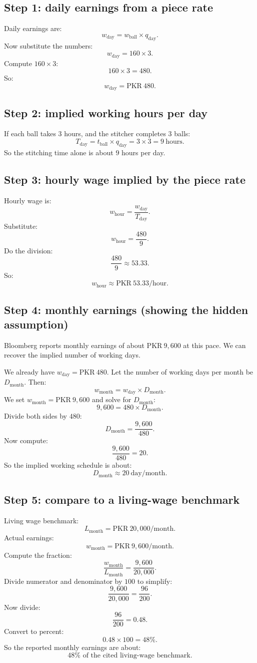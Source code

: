 \documentclass[11pt]{article}
\newcommand{\PKR}{\text{PKR}}
\newcommand{\uBall}{\text{ball}}
\newcommand{\uHour}{\text{hour}}
\newcommand{\uDay}{\text{day}}
\newcommand{\uMonth}{\text{month}}
\begin{document}
\subsection{Step 1: daily earnings from a piece rate}
Daily earnings are:
\[
  w_{\uDay} = w_{\uBall}\times q_{\uDay}.
\]
Now substitute the numbers:
\[
  w_{\uDay} = 160 \times 3.
\]
Compute \(160\times 3\):
\[
  160\times 3 = 480.
\]
So:
\[
  w_{\uDay}=\PKR{}~480.
\]

\subsection{Step 2: implied working hours per day}
If each ball takes \(3\) hours, and the stitcher completes \(3\) balls:
\[
  T_{\uDay} = t_{\uBall}\times q_{\uDay} = 3\times 3 = 9~\text{hours}.
\]
So the stitching time alone is about \(9\) hours per day.

\subsection{Step 3: hourly wage implied by the piece rate}
Hourly wage is:
\[
  w_{\uHour} = \frac{w_{\uDay}}{T_{\uDay}}.
\]
Substitute:
\[
  w_{\uHour}=\frac{480}{9}.
\]
Do the division:
\[
  \frac{480}{9}\approx 53.33.
\]
So:
\[
  w_{\uHour}\approx \PKR{}~53.33/\uHour.
\]

\subsection{Step 4: monthly earnings (showing the hidden assumption)}
Bloomberg reports monthly earnings of about \(\PKR{}~9{,}600\) at this pace.
We can recover the implied number of working days.

We already have \(w_{\uDay}=\PKR{}~480\).
Let the number of working days per month be \(D_{\uMonth}\).
Then:
\[
  w_{\uMonth}=w_{\uDay}\times D_{\uMonth}.
\]
We set \(w_{\uMonth}=\PKR{}~9{,}600\) and solve for \(D_{\uMonth}\):
\[
  9{,}600 = 480\times D_{\uMonth}.
\]
Divide both sides by \(480\):
\[
  D_{\uMonth}=\frac{9{,}600}{480}.
\]
Now compute:
\[
  \frac{9{,}600}{480} = 20.
\]
So the implied working schedule is about:
\[
  D_{\uMonth}\approx 20~\uDay/\uMonth.
\]

\subsection{Step 5: compare to a living-wage benchmark}
Living wage benchmark:
\[
  L_{\uMonth}=\PKR{}~20{,}000/\uMonth.
\]
Actual earnings:
\[
  w_{\uMonth}=\PKR{}~9{,}600/\uMonth.
\]
Compute the fraction:
\[
  \frac{w_{\uMonth}}{L_{\uMonth}}=\frac{9{,}600}{20{,}000}.
\]
Divide numerator and denominator by \(100\) to simplify:
\[
  \frac{9{,}600}{20{,}000}=\frac{96}{200}.
\]
Now divide:
\[
  \frac{96}{200}=0.48.
\]
Convert to percent:
\[
  0.48\times 100 = 48\%.
\]
So the reported monthly earnings are about:
\[
  48\% \text{ of the cited living-wage benchmark.}
\]
\end{document}
